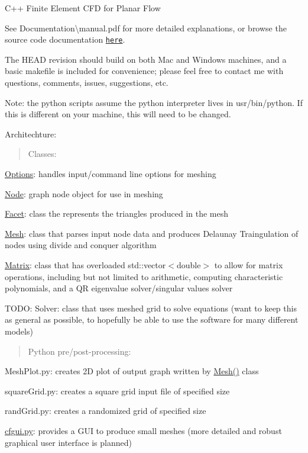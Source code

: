 C++ Finite Element C\+FD for Planar Flow

See Documentation\textbackslash{}manual.\+pdf for more detailed explanations, or browse the source code documentation \href{https://charelstoncrabb.github.io/cylinderFlow/html/index.html}{\tt here}.

The H\+E\+AD revision should build on both Mac and Windows machines, and a basic makefile is included for convenience; please feel free to contact me with questions, comments, issues, suggestions, etc.

Note\+: the python scripts assume the python interpreter lives in \textquotesingle{}usr/bin/python\textquotesingle{}. If this is different on your machine, this will need to be changed.

Architechture\+: \begin{quote}
Classes\+: \end{quote}

\begin{DoxyItemize}
\item \mbox{\hyperlink{class_options}{Options}}\+: handles input/command line options for meshing
\item \mbox{\hyperlink{class_node}{Node}}\+: graph node object for use in meshing
\item \mbox{\hyperlink{class_facet}{Facet}}\+: class the represents the triangles produced in the mesh
\item \mbox{\hyperlink{class_mesh}{Mesh}}\+: class that parses input node data and produces Delaunay Traingulation of nodes using divide and conquer algorithm
\item \mbox{\hyperlink{class_matrix}{Matrix}}\+: class that has overloaded std\+::vector$<$double$>$ to allow for matrix operations, including but not limited to arithmetic, computing characteristic polynomials, and a QR eigenvalue solver/singular values solver
\item T\+O\+DO\+: Solver\+: class that uses meshed grid to solve equations (want to keep this as general as possible, to hopefully be able to use the software for many different models)
\end{DoxyItemize}

\begin{quote}
Python pre/post-\/processing\+: \end{quote}

\begin{DoxyItemize}
\item Mesh\+Plot.\+py\+: creates 2D plot of output graph written by \mbox{\hyperlink{class_mesh}{Mesh()}} class
\item square\+Grid.\+py\+: creates a square grid input file of specified size
\item rand\+Grid.\+py\+: creates a randomized grid of specified size
\item \mbox{\hyperlink{cfgui_8py}{cfgui.\+py}}\+: provides a G\+UI to produce small meshes (more detailed and robust graphical user interface is planned)
\end{DoxyItemize}

